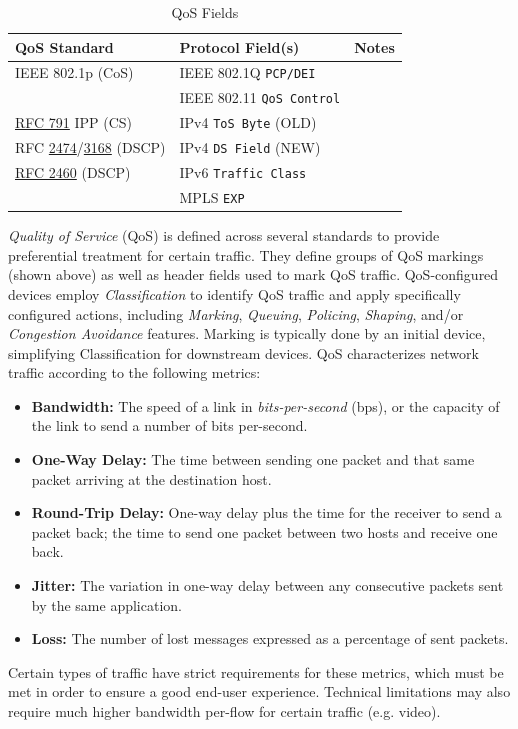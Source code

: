 \documentclass[12pt]{article}
\newcommand{\rfc}[1]{\href{https://datatracker.ietf.org/doc/html/rfc#1}{#1}}
\newcommand{\RFC}[1]{\href{https://datatracker.ietf.org/doc/html/rfc#1}{RFC #1}}
\begin{document}
	\begin{table}[H]
	\centering
	\caption{QoS Fields \label{tab:QOS FIELDS}}
	\begin{tabular}{llr}
	\hline
	\textbf{QoS Standard} 			& \textbf{Protocol Field(s)}		& \textbf{Notes}\\\hline
	IEEE 802.1p (CoS)				& IEEE 802.1Q \texttt{PCP/DEI} 	& \Cref{tab:802.1Q}\\\hline
							& IEEE 802.11 \texttt{QoS Control} 	& \Cref{subsec:802.11 WLANS}\\\hline
	\RFC{791} IPP (CS)			& IPv4 \texttt{ToS Byte} (OLD) 	& \Cref{subsec:IPV4}\\
	RFC \rfc{2474}/\rfc{3168} (DSCP)	& IPv4 \texttt{DS Field} (NEW) 	& \Cref{subsec:IPV4}\\\hline
	\RFC{2460} (DSCP)			& IPv6 \texttt{Traffic Class} 		& \Cref{subsec:IPV6}\\\hline
							& MPLS \texttt{EXP}\\\hline
	\end{tabular}\end{table}
	\textit{Quality of Service} (QoS) is defined across several standards to provide preferential treatment for certain traffic. They define groups of QoS markings (shown above) as well as header fields used to mark QoS traffic. QoS-configured devices employ \textit{Classification} to identify QoS traffic and apply specifically configured actions, including \textit{Marking}, \textit{Queuing}, \textit{Policing}, \textit{Shaping}, and/or \textit{Congestion Avoidance} features. Marking is typically done by an initial device, simplifying Classification for downstream devices. QoS characterizes network traffic according to the following metrics:

	\begin{itemize}
		\label{itm:QOS METRICS}
		\item{\textbf{Bandwidth:} The speed of a link in \textit{bits-per-second} (bps), or the capacity of the link to send a number of bits per-second.}
		\item{\textbf{One-Way Delay:} The time between sending one packet and that same packet arriving at the destination host.}
		\item{\textbf{Round-Trip Delay:} One-way delay plus the time for the receiver to send a packet back; the time to send one packet between two hosts and receive 					one back.}
		\item{\textbf{Jitter:} The variation in one-way delay between any consecutive packets sent by the same application.}
		\item{\textbf{Loss:} The number of lost messages expressed as a percentage of sent packets.}
	\end{itemize}
	Certain types of traffic have strict requirements for these metrics, which must be met in order to ensure a good end-user experience. Technical limitations may also require much higher bandwidth per-flow for certain traffic (e.g. video).
	
\end{document}
